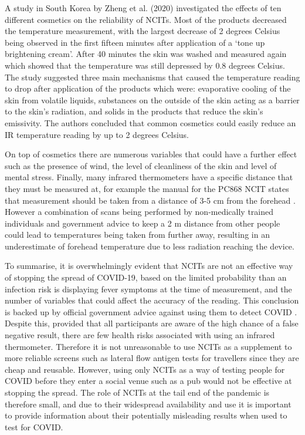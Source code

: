 \documentclass[11pt]{report}
\begin{document}
A study in South Korea by Zheng et al. (2020) \cite{ir15} investigated the effects of ten different cosmetics on the reliability of NCITs. Most of the products decreased the temperature measurement, with the largest decrease of 2 degrees Celsius being observed in the first fifteen minutes after application of a ‘tone up brightening cream’. After 40 minutes the skin was washed and measured again which showed that the temperature was still depressed by 0.8 degrees Celsius. The study suggested three main mechanisms that caused the temperature reading to drop after application of the products which were: evaporative cooling of the skin from volatile liquids, substances on the outside of the skin acting as a barrier to the skin’s radiation, and solids in the products that reduce the skin’s emissivity. The authors concluded that common cosmetics could easily reduce an IR temperature reading by up to 2 degrees Celsius.

On top of cosmetics there are numerous variables that could have a further effect such as the presence of wind, the level of cleanliness of the skin and level of mental stress. Finally, many infrared thermometers have a specific distance that they must be measured at, for example the manual for the PC868 NCIT states that measurement should be taken from a distance of 3-5 cm from the forehead \cite{ir16}. However a combination of scans being performed by non-medically trained individuals and government advice to keep a 2 m distance from other people could lead to temperatures being taken from further away, resulting in an underestimate of forehead temperature due to less radiation reaching the device.

To summarise, it is overwhelmingly evident that NCITs are not an effective way of stopping the spread of COVID-19, based on the limited probability than an infection risk is displaying fever symptoms at the time of measurement, and the number of variables that could affect the accuracy of the reading. This conclusion is backed up by official government advice against using them to detect COVID \cite{ir17}. Despite this, provided that all participants are aware of the high chance of a false negative result, there are few health risks associated with using an infrared thermometer. Therefore it is not unreasonable to use NCITs as a supplement to more reliable screens such as lateral flow antigen tests for travellers since they are cheap and reusable. However, using only NCITs as a way of testing people for COVID before they enter a social venue such as a pub would not be effective at stopping the spread. The role of NCITs at the tail end of the pandemic is therefore small, and due to their widespread availability and use it is important to provide information about their potentially misleading results when used to test for COVID.
\end{document}
